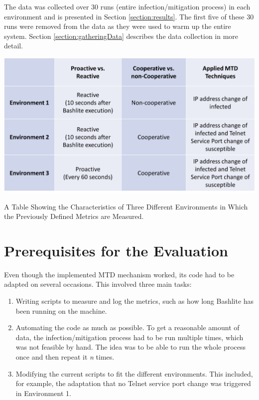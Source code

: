 The data was collected over 30 runs (entire infection/mitigation process) in each environment and is presented in Section \ref{section:results}. The first five of these 30 runs were removed from the data as they were used to warm up the entire system. Section 
\ref{section:gatheringData} describes the data collection in more detail. 


\begin{table}[tph]
\includegraphics[scale=0.65]{assets/tableEvaluationEnvironment.png}
\centering
\caption{A Table Showing the Characteristics of Three Different Environments in Which the Previously Defined Metrics are Measured.}
    \label{graphic:tableEvaluationEnvironment}
\end{table}




\section{Prerequisites for the Evaluation}
Even though the implemented MTD mechanism worked, its code had to be adapted on several occasions. This involved three main tasks:
\begin{enumerate}
\item Writing scripts to measure and log the metrics, such as how long Bashlite has been running on the machine. 
\item Automating the code as much as possible. To get a reasonable amount of data, the infection/mitigation process had to be run multiple times, which was not feasible by hand. The idea was to be able to run the whole process once and then repeat it \textit{n} times.
\item Modifying the current scripts to fit the different environments. This included, for example, the adaptation that no Telnet service port change was triggered in Environment 1.
\end{enumerate}

